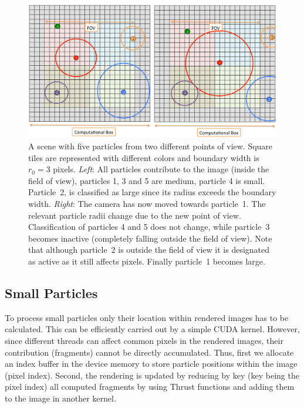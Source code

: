 \documentclass[preprint,5pt]{elsarticle}
\begin{document}
\begin{figure}
\includegraphics[scale=0.14]{fov.eps}
\caption{A scene with five particles from two different points of view. Square tiles are
represented with different colors and boundary width is $r_0=3$ pixels. {\em Left}: All particles contribute to the image (inside the field of view), particles 1, 3 and 5
are medium, particle 4 is small. Particle~2, is classified as large since its radius exceeds the boundary width. {\em Right}: The camera has now moved towards particle~1. The relevant particle radii change due to the new point
of view. Classification of particles 4 and 5 does not change, while particle~3
becomes inactive (completely falling outside the field of view). Note that although particle~2 is outside the field of view it is designated as active as it still affects pixels.
Finally particle~1 becomes large.
}
\label{fig:fov}
\end{figure}

\subsection{Small Particles}
\label{sec:smallparticles}
To process small particles only their location within rendered images has to be calculated. This can be efficiently carried out by a simple CUDA kernel. However, since different threads can affect common pixels in the rendered images, their contribution (fragments) cannot be directly accumulated. Thus, first we allocate an index buffer in the device memory to store particle positions within the image (pixel index). Second, the rendering is updated by reducing by key (key being the pixel index) all computed fragments by using Thrust functions and adding them to the image in another kernel.
\end{document}
